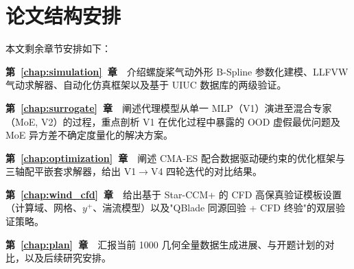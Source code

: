 \section{论文结构安排}

本文剩余章节安排如下：

\textbf{第~\ref{chap:simulation}~章}~~介绍螺旋桨气动外形 B-Spline 参数化建模、LLFVW 气动求解器、自动化仿真框架以及基于 UIUC 数据库的两级验证。

\textbf{第~\ref{chap:surrogate}~章}~~阐述代理模型从单一 MLP（V1）演进至混合专家（MoE, V2）的过程，重点剖析 V1 在优化过程中暴露的 OOD 虚假最优问题及 MoE 异方差不确定度量化的解决方案。

\textbf{第~\ref{chap:optimization}~章}~~阐述 CMA-ES 配合数据驱动硬约束的优化框架与三轴配平嵌套求解器，给出 V1$\to$V4 四轮迭代的对比结果。

\textbf{第~\ref{chap:wind_cfd}~章}~~给出基于 Star-CCM+ 的 CFD 高保真验证模板设置（计算域、网格、$y^+$、湍流模型）以及"QBlade 同源回验 + CFD 终验"的双层验证策略。

\textbf{第~\ref{chap:plan}~章}~~汇报当前 1000 几何全量数据生成进展、与开题计划的对比，以及后续研究安排。
